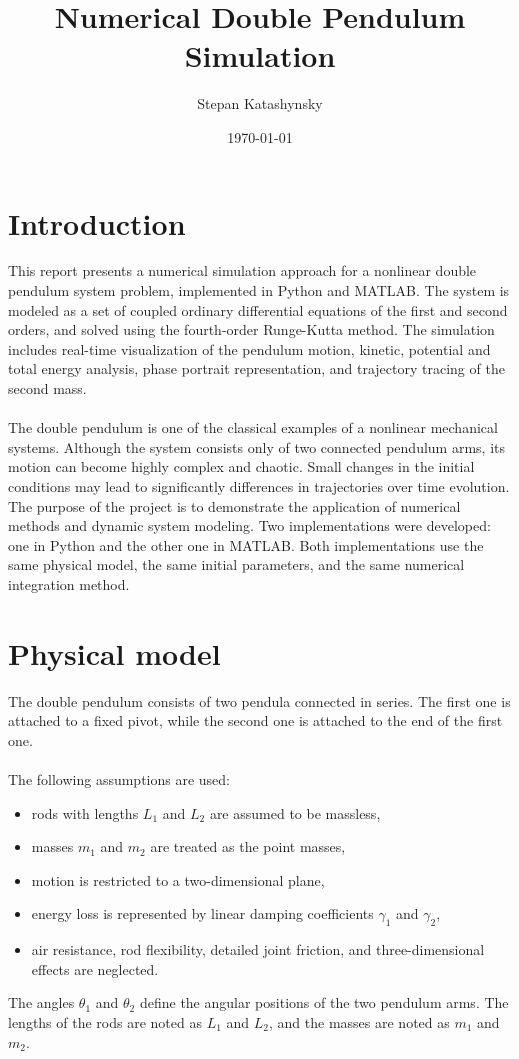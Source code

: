 \documentclass[12pt,a4paper]{article}
\title{
    \textbf{Numerical Double Pendulum Simulation} \\
}
\author{
    Stepan Katashynsky \\
}
\date{\today}
\begin{document}
\maketitle

\section{Introduction}
This report presents a numerical simulation approach for a nonlinear double pendulum system problem, implemented in Python and MATLAB. The system is modeled as a set of coupled ordinary differential equations of the first and second orders, and solved using the fourth-order Runge-Kutta method. The simulation includes real-time visualization of the pendulum motion, kinetic, potential and total energy analysis, phase portrait representation, and trajectory tracing of the second mass.
\\\\
The double pendulum is one of the classical examples of a nonlinear mechanical systems. Although the system consists only of two connected pendulum arms, its motion can become highly complex and chaotic. Small changes in the initial conditions may lead to significantly differences in trajectories over time evolution. The purpose of the project is to demonstrate the application of numerical methods and dynamic system modeling. Two implementations were developed: one in Python and the other one in MATLAB. Both implementations use the same physical model, the same initial parameters, and the same numerical integration method.

\section{Physical model}

The double pendulum consists of two pendula connected in series. The first one is attached to a fixed pivot, while the second one is attached to the end of the first one.
\\\\
The following assumptions are used:
\begin{itemize}
    \item rods with lengths $L_1$ and $L_2$ are assumed to be massless,
    \item masses $m_1$ and $m_2$ are treated as the point masses,
    \item motion is restricted to a two-dimensional plane,
    \item energy loss is represented by linear damping coefficients $\gamma_1$ and $\gamma_2$,
    \item air resistance, rod flexibility, detailed joint friction, and three-dimensional effects are neglected.
\end{itemize}
\noindent
The angles $\theta_1$ and $\theta_2$ define the angular positions of the two pendulum arms. The lengths of the rods are noted as $L_1$ and $L_2$, and the masses are noted as $m_1$ and $m_2$.
\end{document}
